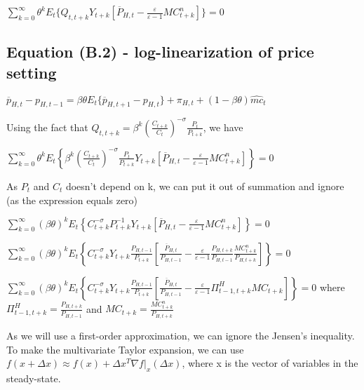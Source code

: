\documentclass[
]{article}
\begin{document}
\(\displaystyle \sum_{k=0}^\infty \theta^kE_t \bigg\{ Q_{t,t+k} Y_{t+k } \left[ \overline{P}_{H,t}-\frac{\varepsilon}{\varepsilon-1} MC_{t+k}^n \right] \bigg\} = 0\)

\vspace{12pt}

\hypertarget{equation-b.2---log-linearization-of-price-setting}{%
\subsection{Equation (B.2) - log-linearization of price
setting}\label{equation-b.2---log-linearization-of-price-setting}}

\(\overline{p}_{H,t}-p_{H,t-1}=\beta \theta E_t \{ \overline{p}_{H,t+1}-p_{H,t}\} + \pi_{H,t}+(1-\beta \theta)\widehat{mc}_t\)

\vspace{8pt}

Using the fact that
\(\displaystyle Q_{t,t+k}=\beta^k \left( \frac{C_{t+k}}{C_t} \right)^{-\sigma}\frac{P_t}{P_{t+k}}\),
we have

\(\displaystyle \sum_{k=0}^\infty \theta^kE_t \left\{ \beta^k \left( \frac{C_{t+k}}{C_t} \right)^{-\sigma}\frac{P_t}{P_{t+k}} Y_{t+k } \left[ \overline{P}_{H,t}-\frac{\varepsilon}{\varepsilon-1} MC_{t+k}^n \right] \right\} = 0\)

As \(P_t\) and \(C_t\) doesn't depend on k, we can put it out of
summation and ignore (as the expression equals zero)

\(\displaystyle \sum_{k=0}^\infty (\beta \theta)^kE_t \left\{ C_{t+k}^{-\sigma}P_{t+k}^{-1} Y_{t+k } \left[ \overline{P}_{H,t}-\frac{\varepsilon}{\varepsilon-1} MC_{t+k}^n \right] \right\} = 0\)

\(\displaystyle \sum_{k=0}^\infty (\beta \theta)^kE_t \left\{ C_{t+k}^{-\sigma} Y_{t+k } \frac{P_{H,t-1}}{P_{t+k}} \left[ \frac{\overline{P}_{H,t}}{P_{H,t-1}}-\frac{\varepsilon}{\varepsilon-1}\frac{P_{H,t+k}}{P_{H,t-1}} \frac{MC_{t+k}^n}{P_{H,t+k}} \right] \right\} = 0\)

\(\displaystyle \sum_{k=0}^\infty (\beta \theta)^kE_t \left\{ C_{t+k}^{-\sigma} Y_{t+k } \frac{P_{H,t-1}}{P_{t+k}} \left[ \frac{\overline{P}_{H,t}}{P_{H,t-1}}-\frac{\varepsilon}{\varepsilon-1}\Pi_{t-1,t+k}^H MC_{t+k}\right] \right\} = 0\)
where \(\displaystyle \Pi_{t-1,t+k}^H = \frac{P_{H,t+k}}{P_{H,t-1}}\)
and \(\displaystyle MC_{t+k} = \frac{MC_{t+k}^n}{P_{H,t+k}}\)

As we will use a first-order approximation, we can ignore the Jensen's
inequality. To make the multivariate Taylor expansion, we can use
\(f(x+\Delta x) \approx f(x)+ \Delta x^T \nabla f|_x(\Delta x)\), where
x is the vector of variables in the steady-state.
\end{document}
